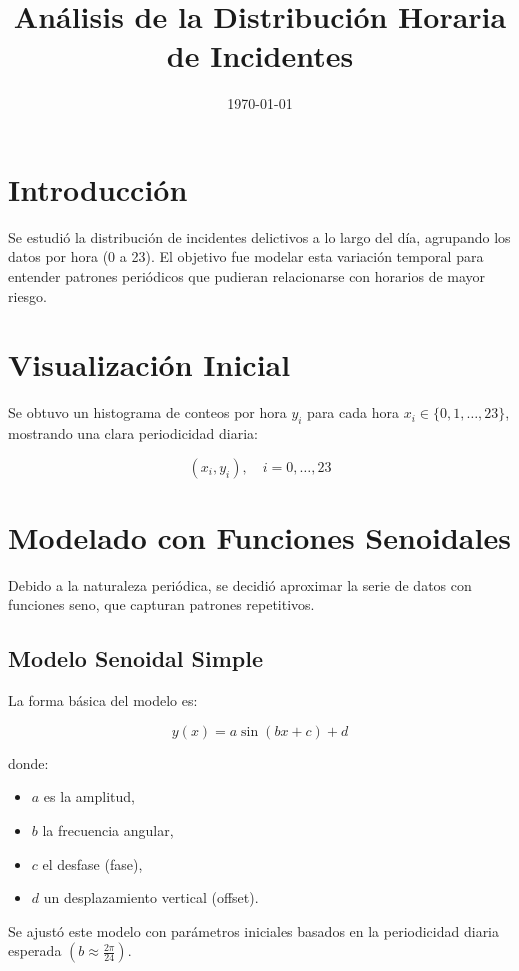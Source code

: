 \documentclass[a4paper,12pt]{article}
\title{Análisis de la Distribución Horaria de Incidentes}
\author{}
\date{\today}
\begin{document}
\maketitle

\section{Introducción}

Se estudió la distribución de incidentes delictivos a lo largo del día, agrupando los datos por hora (0 a 23). El objetivo fue modelar esta variación temporal para entender patrones periódicos que pudieran relacionarse con horarios de mayor riesgo.

\section{Visualización Inicial}

Se obtuvo un histograma de conteos por hora \( y_i \) para cada hora \( x_i \in \{0,1,\ldots,23\} \), mostrando una clara periodicidad diaria:

\[
(x_i, y_i), \quad i=0, \ldots, 23
\]

\section{Modelado con Funciones Senoidales}

Debido a la naturaleza periódica, se decidió aproximar la serie de datos con funciones seno, que capturan patrones repetitivos.

\subsection{Modelo Senoidal Simple}

La forma básica del modelo es:

\[
y(x) = a \sin(bx + c) + d
\]

donde:

\begin{itemize}
    \item \( a \) es la amplitud,
    \item \( b \) la frecuencia angular,
    \item \( c \) el desfase (fase),
    \item \( d \) un desplazamiento vertical (offset).
\end{itemize}

Se ajustó este modelo con parámetros iniciales basados en la periodicidad diaria esperada \( \left(b \approx \frac{2\pi}{24}\right) \).
\end{document}
